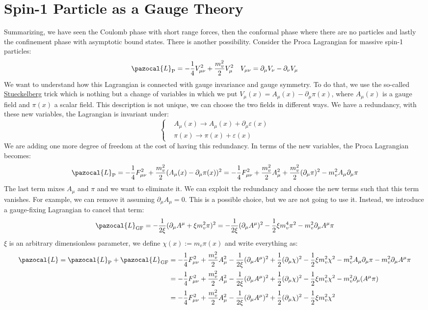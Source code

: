 \documentclass[../main.tex]{subfiles}
\begin{document}
\section{Spin-1 Particle as a Gauge Theory}
Summarizing, we have seen the Coulomb phase with short range forces, then the conformal phase where there are no particles and lastly the confinement phase with asymptotic bound states. There is another possibility. Consider the Proca Lagrangian for massive spin-1 particles:
\[
\pazocal{L}_{\text{P}}=-\frac{1}{4}V_{\mu\nu}^2+\frac{m_v^2}{2}V_\mu^2 \quad V_{\mu\nu}=\partial_\mu V_\nu-\partial_\nu V_\mu
\]
We want to understand how this Lagrangian is connected with gauge invariance and gauge symmetry. To do that, we use the so-called \href{https://en.wikipedia.org/wiki/Ernst_Stueckelberg}{Stueckelberg} trick which is nothing but a change of variables in which we put $V_\mu(x)=A_\mu(x)-\partial_\mu\pi(x)$, where $A_\mu(x)$ is a gauge field and $\pi(x)$  a scalar field. This description is not unique, we can choose the two fields in different ways. We have a redundancy, with these new variables, the Lagrangian is invariant under:
\[
\left\{
\begin{aligned}
&A_\mu(x)\to A_\mu(x)+\partial_\mu\varepsilon(x)\\
&\pi(x)\to\pi(x)+\varepsilon(x)
\end{aligned}
\right.
\]
We are adding one more degree of freedom at the cost of having this redundancy. In terms of the new variables, the Proca Lagrangian becomes:
\[
\pazocal{L}_{\text{P}}=-\frac{1}{4}F_{\mu\nu}^2+\frac{m_v^2}{2}(A_\mu(x)-\partial_\mu\pi(x))^2=-\frac{1}{4}F_{\mu\nu}^2+\frac{m_v^2}{2}A^2_\mu+\frac{m_v^2}{2}(\partial_\mu\pi)^2-m_v^2A_\mu\partial_\mu\pi
\]
The last term mixes $A_\mu$ and $\pi$ and we want to eliminate it. We can exploit the redundancy and choose the new terms such that this term vanishes. For example, we can remove it assuming $\partial_\mu A_\mu=0$. This is a possible choice, but we are not going to use it. Instead, we introduce a gauge-fixing Lagrangian to cancel that term:
\[
\pazocal{L}_{\text{GF}}=-\frac{1}{2\xi}(\partial_\mu A^\mu+\xi m_v^2\pi)^2=-\frac{1}{2\xi}(\partial_\mu A^\mu)^2-\frac{1}{2}\xi m_v^4\pi^2-m_v^2\partial_\mu A^\mu\pi
\]
$\xi$ is an arbitrary dimensionless parameter, we define $\chi(x):=m_v\pi(x)$ and write everything as:
\begin{align*}
\pazocal{L}=\pazocal{L}_{\text{P}}+\pazocal{L}_{\text{GF}}&=-\frac{1}{4}F_{\mu\nu}^2+\frac{m_v^2}{2}A_\mu^2-\frac{1}{2\xi}(\partial_\mu A^\mu)^2+\frac{1}{2}(\partial_\mu\chi)^2-\frac{1}{2}\xi m_v^2\chi^2-m_v^2A_\mu\partial_\mu\pi-m_v^2\partial_\mu A^\mu\pi\\
&=-\frac{1}{4}F_{\mu\nu}^2+\frac{m_v^2}{2}A_\mu^2-\frac{1}{2\xi}(\partial_\mu A^\mu)^2+\frac{1}{2}(\partial_\mu\chi)^2-\frac{1}{2}\xi m_v^2\chi^2-m_v^2\partial_\mu(A^\mu\pi)\\
&=-\frac{1}{4}F_{\mu\nu}^2+\frac{m_v^2}{2}A_\mu^2-\frac{1}{2\xi}(\partial_\mu A^\mu)^2+\frac{1}{2}(\partial_\mu\chi)^2-\frac{1}{2}\xi m_v^2\chi^2
\end{align*}
\end{document}
